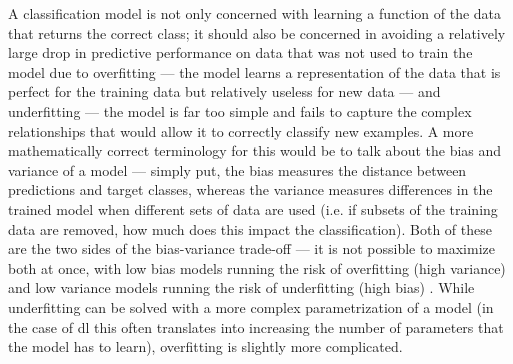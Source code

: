 A classification model is not only concerned with learning a function of the data that returns the correct class; it should also be concerned in avoiding a relatively large drop in predictive performance on data that was not used to train the model due to overfitting --- the model learns a representation of the data that is perfect for the training data but relatively useless for new data --- and underfitting --- the model is far too simple and fails to capture the complex relationships that would allow it to correctly classify new examples. A more mathematically correct terminology for this would be to talk about the bias and variance of a model --- simply put, the bias measures the distance between predictions and target classes, whereas the variance measures differences in the trained model when different sets of data are used (i.e. if subsets of the training data are removed, how much does this impact the classification). Both of these are the two sides of the bias-variance trade-off --- it is not possible to maximize both at once, with low bias models running the risk of overfitting (high variance) and low variance models running the risk of underfitting (high bias) \cite{James2013-py}. While underfitting can be solved with a more complex parametrization of a model (in the case of \ac{dl} this often translates into increasing the number of parameters that the model has to learn), overfitting is slightly more complicated.

